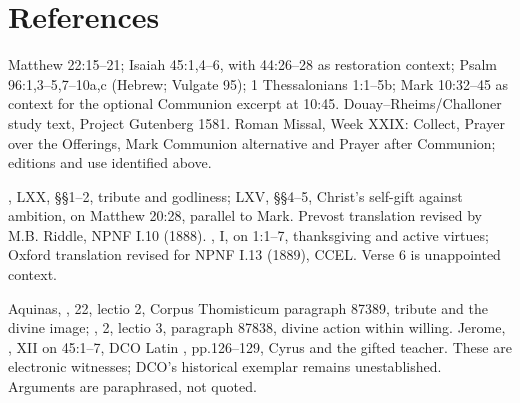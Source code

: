 \section{References}
\begin{description}[style=nextline,leftmargin=0pt,labelsep=0pt,itemsep=.35em]
\item[Scripture and prayer]
Matthew 22:15--21; Isaiah 45:1,4--6, with 44:26--28 as restoration context; Psalm 96:1,3--5,7--10a,c (Hebrew; Vulgate 95); 1 Thessalonians 1:1--5b; Mark 10:32--45 as context for the optional Communion excerpt at 10:45. Douay--Rheims/Challoner study text, Project Gutenberg 1581. Roman Missal, Week XXIX: Collect, Prayer over the Offerings, Mark Communion alternative and Prayer after Communion; editions and use identified above.
\item[John Chrysostom]
, LXX, §§1--2, tribute and godliness; LXV, §§4--5, Christ's self-gift against ambition, on Matthew 20:28, parallel to Mark. Prevost translation revised by M.B. Riddle, NPNF I.10 (1888). , I, on 1:1--7, thanksgiving and active virtues; Oxford translation revised for NPNF I.13 (1889), CCEL. Verse 6 is unappointed context.
\item[Thomas Aquinas and Jerome]
Aquinas, , 22, lectio 2, Corpus Thomisticum paragraph 87389, tribute and the divine image; , 2, lectio 3, paragraph 87838, divine action within willing. Jerome, , XII on 45:1--7, DCO Latin , pp.126--129, Cyrus and the gifted teacher. These are electronic witnesses; DCO's historical exemplar remains unestablished. Arguments are paraphrased, not quoted.
\end{description}
